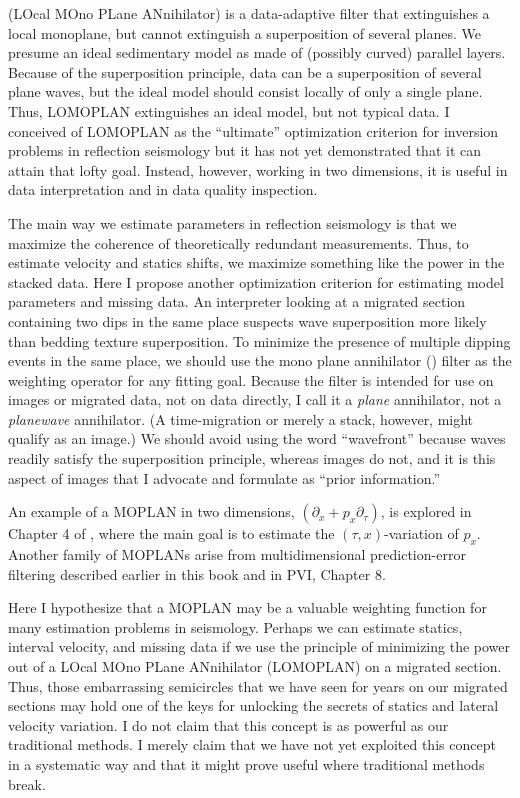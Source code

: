  (LOcal MOno PLane ANnihilator)
is a data-adaptive filter that extinguishes a local monoplane,
but cannot extinguish a superposition of several planes.
We presume an ideal sedimentary model
as made of (possibly curved) parallel layers.
Because of the superposition principle,
data can be a superposition of several plane waves,
but the ideal model should consist locally of only a single plane.
Thus, LOMOPLAN extinguishes an ideal model, but not typical data.
I conceived of LOMOPLAN as the ``ultimate'' optimization criterion
for inversion problems in reflection seismology
\cite[]{Claerbout.sep.73.409}
but it has not yet demonstrated that it can attain that lofty goal.
Instead,
however, working in two dimensions,
it is useful in data interpretation
and in data quality inspection.

\par
The main way we estimate parameters in reflection seismology
is that we maximize the coherence of theoretically redundant measurements.
Thus, to estimate velocity and statics shifts,
we maximize something like the power in the stacked data.
Here I propose another optimization criterion
for estimating model parameters and missing data.
An interpreter looking at a migrated section containing
two dips in the same place
suspects wave superposition more likely than bedding texture superposition.
To minimize the presence of multiple dipping events in the same place,
we should use the mono plane annihilator () filter
as the weighting operator for any fitting goal.
Because the filter is intended for use on images or migrated data,
not on data directly,
I call it a {\it plane} annihilator, not a {\it planewave} annihilator.
(A time-migration or merely a stack, however, might qualify as an image.)
We should avoid using the word ``wavefront''
because waves readily satisfy the superposition principle,
whereas images do not,
and it is this aspect of images that I advocate and formulate
as ``prior information.''

\par
An example of a MOPLAN in two dimensions,
$(\partial_x + p_x \partial_\tau)$,
is explored in Chapter 4 of 
\cite{Claerbout.blackwell.92},
where the main goal is to estimate the
$(\tau ,x)$-variation of $p_x$.
Another family of MOPLANs arise from multidimensional
prediction-error filtering
described earlier in this book and
in PVI, Chapter 8.

\par
Here I hypothesize that a MOPLAN may be a valuable weighting function
for many estimation problems in seismology.
Perhaps we can estimate statics, interval velocity, and missing data
if we use the principle of minimizing the power out
of a LOcal MOno PLane ANnihilator (LOMOPLAN) on a migrated section.
Thus, those embarrassing semicircles that we have seen for years
on our migrated sections may hold one of the keys
for unlocking the secrets of statics and lateral velocity variation.
I do not claim that this concept is as powerful as our traditional methods.
I merely claim that we have not yet exploited this concept in a systematic way
and that it might prove useful where traditional methods break.

